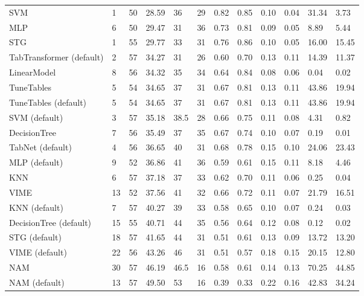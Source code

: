 \begin{tabular}{lllllrllllll}
SVM & 1 & 50 & 28.59 & 36 & 29 & 0.82 & 0.85 & 0.10 & 0.04 & 31.34 & 3.73 \\
MLP & 6 & 50 & 29.47 & 31 & 36 & 0.73 & 0.81 & 0.09 & 0.05 & 8.89 & 5.44 \\
STG & 1 & 55 & 29.77 & 33 & 31 & 0.76 & 0.86 & 0.10 & 0.05 & 16.00 & 15.45 \\
TabTransformer (default) & 2 & 57 & 34.27 & 31 & 26 & 0.60 & 0.70 & 0.13 & 0.11 & 14.39 & 11.37 \\
LinearModel & 8 & 56 & 34.32 & 35 & 34 & 0.64 & 0.84 & 0.08 & 0.06 & 0.04 & 0.02 \\
TuneTables & 5 & 54 & 34.65 & 37 & 31 & 0.67 & 0.81 & 0.13 & 0.11 & 43.86 & 19.94 \\
TuneTables (default) & 5 & 54 & 34.65 & 37 & 31 & 0.67 & 0.81 & 0.13 & 0.11 & 43.86 & 19.94 \\
SVM (default) & 3 & 57 & 35.18 & 38.5 & 28 & 0.66 & 0.75 & 0.11 & 0.08 & 4.31 & 0.82 \\
DecisionTree & 7 & 56 & 35.49 & 37 & 35 & 0.67 & 0.74 & 0.10 & 0.07 & 0.19 & 0.01 \\
TabNet (default) & 4 & 56 & 36.65 & 40 & 31 & 0.68 & 0.78 & 0.15 & 0.10 & 24.06 & 23.43 \\
MLP (default) & 9 & 52 & 36.86 & 41 & 36 & 0.59 & 0.61 & 0.15 & 0.11 & 8.18 & 4.46 \\
KNN & 6 & 57 & 37.18 & 37 & 33 & 0.62 & 0.70 & 0.11 & 0.06 & 0.25 & 0.04 \\
VIME & 13 & 52 & 37.56 & 41 & 32 & 0.66 & 0.72 & 0.11 & 0.07 & 21.79 & 16.51 \\
KNN (default) & 7 & 57 & 40.27 & 39 & 33 & 0.58 & 0.65 & 0.10 & 0.07 & 0.24 & 0.03 \\
DecisionTree (default) & 15 & 55 & 40.71 & 44 & 35 & 0.56 & 0.64 & 0.12 & 0.08 & 0.12 & 0.02 \\
STG (default) & 18 & 57 & 41.65 & 44 & 31 & 0.51 & 0.61 & 0.13 & 0.09 & 13.72 & 13.20 \\
VIME (default) & 22 & 56 & 43.26 & 46 & 31 & 0.51 & 0.57 & 0.18 & 0.15 & 20.15 & 12.80 \\
NAM & 30 & 57 & 46.19 & 46.5 & 16 & 0.58 & 0.61 & 0.14 & 0.13 & 70.25 & 44.85 \\
NAM (default) & 13 & 57 & 49.50 & 53 & 16 & 0.39 & 0.33 & 0.22 & 0.16 & 42.83 & 34.24 \\
\bottomrule
\end{tabular}
